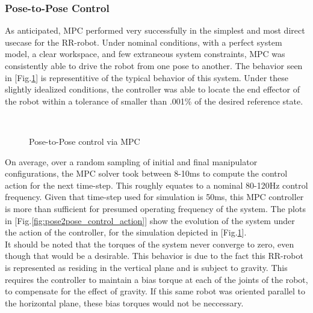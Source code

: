 \documentclass[journal]{IEEEtran}
\begin{document}
\subsubsection{Pose-to-Pose Control}

As anticipated, MPC performed very successfully in the simplest and most direct usecase for the RR-robot. Under nominal conditions, with a perfect system model, a clear workspace, and few extraneous system constraints, MPC was consistently able to drive the robot from one pose to another. The behavior seen in [Fig.\ref{fig:pose2pose}] is representitive of the typical behavior of this system. Under these slightly idealized conditions, the controller was able to locate the end effector of the robot within a tolerance of smaller than .001\% of the desired reference state.

\begin{figure}[hb]%
    \centering
    \qquad
    \\
    \qquad
    \caption{Pose-to-Pose control via MPC}%
    \label{fig:pose2pose}%
\end{figure}

On average, over a random sampling of initial and final manipulator configurations, the MPC solver took between 8-10ms to compute the control action for the next time-step. This roughly equates to a nominal 80-120Hz control frequency. Given that time-step used for simulation is 50ms, this MPC controller is more than sufficient for presumed operating frequency of the system. The plots in [Fig.\ref{fig:pose2pose_control_action}] show the evolution of the system under the action of the controller, for the simulation depicted in [Fig.\ref{fig:pose2pose}]. \\

 It should be noted that the torques of the system never converge to zero, even though that would be a desirable. This behavior is due to the fact this RR-robot is represented as residing in the vertical plane and is subject to gravity. This requires the controller to maintain a bias torque at each of the joints of the robot, to compensate for the effect of gravity. If this same robot was oriented  parallel to the horizontal plane, these bias torques would not be neccessary. \\
\end{document}
